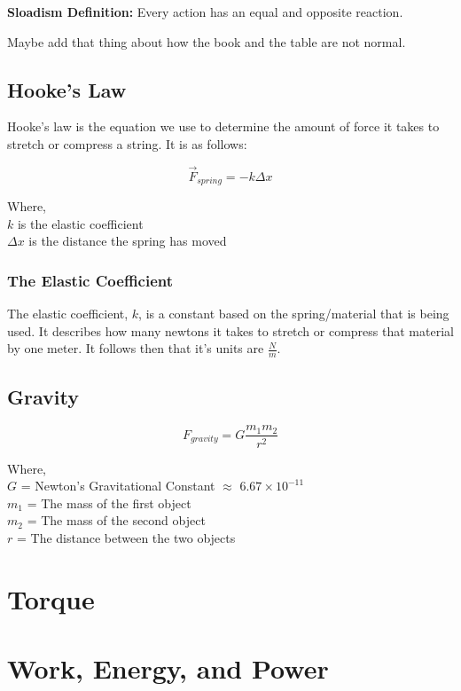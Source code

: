 \documentclass{article}
\begin{document}
\noindent \textbf{Sloadism Definition:} Every action has an equal and opposite reaction.

Maybe add that thing about how the book and the table are not normal.

\subsection{Hooke's Law}
Hooke's law is the equation we use to determine the amount of force it takes to stretch or
compress a string. It is as follows:

\begin{equation}\label{eq : hooke}
    \vec{F}_{spring} = -k \Delta x
\end{equation}

\noindent Where, \\
\indent $k$ is the elastic coefficient \\
\indent $\Delta x$ is the distance the spring has moved

\subsubsection{The Elastic Coefficient}
The elastic coefficient, $k$, is a constant based on the spring/material that is being used.
It describes how many newtons it takes to stretch or compress that material by one meter.
It follows then that it's units are $\frac{N}{m}$.
\subsection{Gravity}
\begin{equation}\label{eq : grav force}
    F_{gravity} = G\frac{m_1 m_2}{r^2}
\end{equation}

\noindent Where, \\
\indent $G$ = Newton's Gravitational Constant $\approx$ $6.67 \times 10^{-11}$ \\
\indent $m_1$ = The mass of the first object \\
\indent $m_2$ = The mass of the second object \\
\indent $r$ = The distance between the two objects \\

\newpage
\section{Torque}

\section{Work, Energy, and Power}
\end{document}
